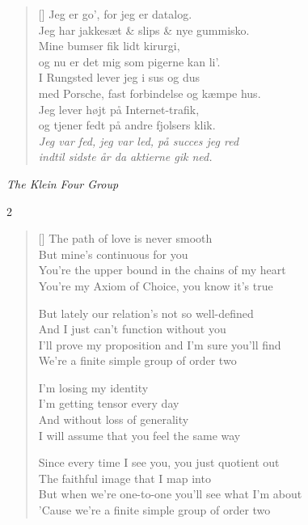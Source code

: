 {\begin{multicols}
\begin{verse}[\versewidth]
Jeg er go’, for jeg er datalog.\\
Jeg har jakkesæt \& slips \& nye gummisko.\\
Mine bumser fik lidt kirurgi,\\
og nu er det mig som pigerne kan li’.\\
I Rungsted lever jeg i sus og dus\\
med Porsche, fast forbindelse og kæmpe hus.\\
Jeg lever højt på Internet-trafik,\\
og tjener fedt på andre fjolsers klik.\\
\emph{Jeg var fed, jeg var led, på succes jeg red\\
indtil sidste år da aktierne gik ned.}
\end{verse}
\end{multicols}

\newpage


\label{FiniteSimpleGroup}
{\small\itshape The Klein Four Group}

\begin{multicols}2
\settowidth{\versewidth}{And I just can't function without you}
\begin{verse}[\versewidth]
The path of love is never smooth\\
But mine's continuous for you\\
You're the upper bound in the chains of my heart\\
You're my Axiom of Choice, you know it's true

But lately our relation's not so well-defined\\
And I just can't function without you\\
I'll prove my proposition and I'm sure you'll find\\
We're a finite simple group of order two

I'm losing my identity\\
I'm getting tensor every day\\
And without loss of generality\\
I will assume that you feel the same way

Since every time I see you, you just quotient out\\
The faithful image that I map into\\
But when we're one-to-one you'll see what I'm about\\
'Cause we're a finite simple group of order two


\end{verse}
\end{multicols}}
